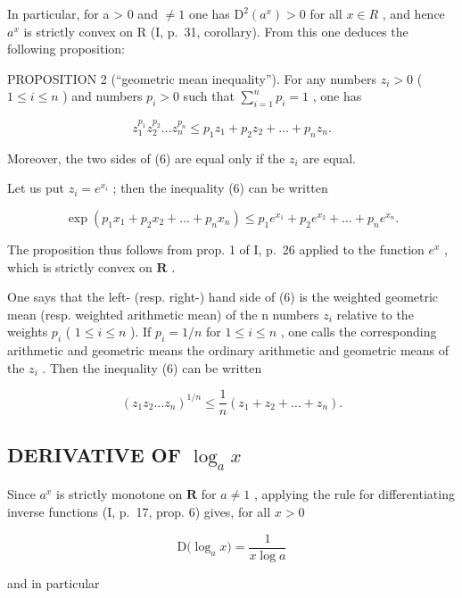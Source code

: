 In particular, for a \textgreater{} 0 and \(\neq 1\) one has \(\mathrm{D}^{2}(a^{x}) > 0\) for all \(x \in R\) , and hence \(a^{x}\) is strictly convex on R (I, p.~31, corollary). From this one deduces the following proposition:

PROPOSITION 2 (``geometric mean inequality''). For any numbers \(z_{i} > 0\) ( \(1 \leqslant i \leqslant n\) ) and numbers \(p_{i} > 0\) such that \(\sum_{i=1}^{n} p_{i} = 1\) , one has

\[
z _ {1} ^ {p _ {1}} z _ {2} ^ {p _ {2}} \dots z _ {n} ^ {p _ {n}} \leqslant p _ {1} z _ {1} + p _ {2} z _ {2} + \dots + p _ {n} z _ {n}.\tag{6}
\]

Moreover, the two sides of (6) are equal only if the \(z_{i}\) are equal.

Let us put \(z_{i} = e^{x_{i}}\) ; then the inequality (6) can be written

\[
\exp \left(p _ {1} x _ {1} + p _ {2} x _ {2} + \dots + p _ {n} x _ {n}\right) \leqslant p _ {1} e ^ {x _ {1}} + p _ {2} e ^ {x _ {2}} + \dots + p _ {n} e ^ {x _ {n}}.\tag{7}
\]

The proposition thus follows from prop. 1 of I, p.~26 applied to the function \(e^x\) , which is strictly convex on \(\mathbf{R}\) .

One says that the left- (resp. right-) hand side of (6) is the weighted geometric mean (resp. weighted arithmetic mean) of the n numbers \(z_{i}\) relative to the weights \(p_{i}\) ( \(1 \leqslant i \leqslant n\) ). If \(p_{i} = 1/n\) for \(1 \leqslant i \leqslant n\) , one calls the corresponding arithmetic and geometric means the ordinary arithmetic and geometric means of the \(z_{i}\) . Then the inequality (6) can be written

\[
\left(z _ {1} z _ {2} \dots z _ {n}\right) ^ {1 / n} \leqslant \frac {1}{n} \left(z _ {1} + z _ {2} + \dots + z _ {n}\right).\tag{8}
\]

\subsection{\texorpdfstring{DERIVATIVE OF \(\log_a x\)}{DERIVATIVE OF LOG BASE A OF X}}

Since \(a^x\) is strictly monotone on \(\mathbf{R}\) for \(a \neq 1\) , applying the rule for differentiating inverse functions (I, p.~17, prop. 6) gives, for all \(x > 0\)

\[
\mathrm{D} \big (\log_ {a} x \big) = \frac {1}{x \log a}\tag{9}
\]

and in particular

